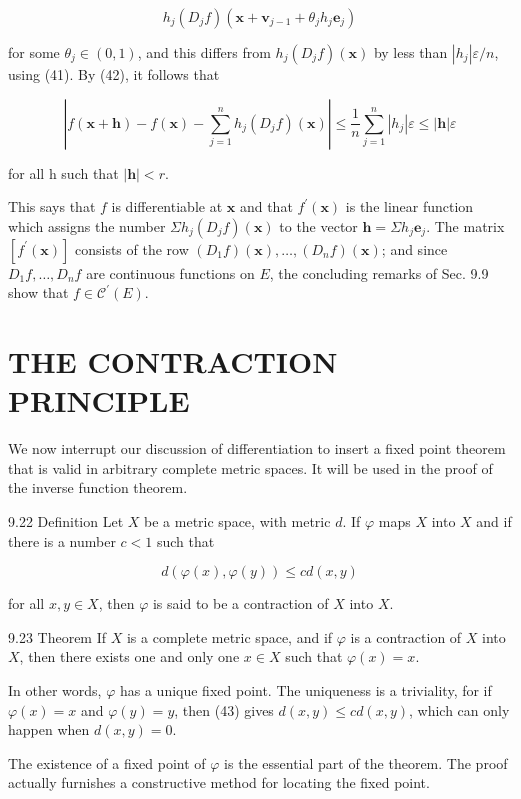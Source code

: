 \documentclass[10pt]{article}
\begin{document}
$$
h_{j}\left(D_{j} f\right)\left(\mathbf{x}+\mathbf{v}_{j-1}+\theta_{j} h_{j} \mathbf{e}_{j}\right)
$$

for some $\theta_{j} \in(0,1)$, and this differs from $h_{j}\left(D_{j} f\right)(\mathbf{x})$ by less than $\left|h_{j}\right| \varepsilon / n$, using (41). By (42), it follows that

$$
\left|f(\mathbf{x}+\mathbf{h})-f(\mathbf{x})-\sum_{j=1}^{n} h_{j}\left(D_{j} f\right)(\mathbf{x})\right| \leq \frac{1}{n} \sum_{j=1}^{n}\left|h_{j}\right| \varepsilon \leq|\mathbf{h}| \varepsilon
$$

for all h such that $|\mathbf{h}|<r$.

This says that $f$ is differentiable at $\mathbf{x}$ and that $f^{\prime}(\mathbf{x})$ is the linear function which assigns the number $\Sigma h_{j}\left(D_{j} f\right)(\mathbf{x})$ to the vector $\mathbf{h}=\Sigma h_{j} \mathbf{e}_{j}$. The matrix $\left[f^{\prime}(\mathbf{x})\right]$ consists of the row $\left(D_{1} f\right)(\mathbf{x}), \ldots,\left(D_{n} f\right)(\mathbf{x})$; and since $D_{1} f, \ldots, D_{n} f$ are continuous functions on $E$, the concluding remarks of Sec. 9.9 show that $f \in \mathscr{C}^{\prime}(E)$.

\section{THE CONTRACTION PRINCIPLE}
We now interrupt our discussion of differentiation to insert a fixed point theorem that is valid in arbitrary complete metric spaces. It will be used in the proof of the inverse function theorem.

9.22 Definition Let $X$ be a metric space, with metric $d$. If $\varphi$ maps $X$ into $X$ and if there is a number $c<1$ such that

$$
d(\varphi(x), \varphi(y)) \leq c d(x, y)
$$

for all $x, y \in X$, then $\varphi$ is said to be a contraction of $X$ into $X$.

9.23 Theorem If $X$ is a complete metric space, and if $\varphi$ is a contraction of $X$ into $X$, then there exists one and only one $x \in X$ such that $\varphi(x)=x$.

In other words, $\varphi$ has a unique fixed point. The uniqueness is a triviality, for if $\varphi(x)=x$ and $\varphi(y)=y$, then (43) gives $d(x, y) \leq c d(x, y)$, which can only happen when $d(x, y)=0$.

The existence of a fixed point of $\varphi$ is the essential part of the theorem. The proof actually furnishes a constructive method for locating the fixed point.
\end{document}
